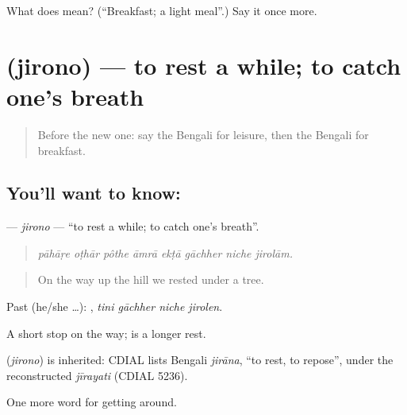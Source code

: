 \begin{tcolorbox}[breakable,colback=teal!4,colframe=teal!35!black,title={Before you move on}]
What does  mean? (\textquotedblleft{}Breakfast; a light meal\textquotedblright{}.) Say it once more.
\end{tcolorbox}
\section[\texorpdfstring{\bn{জিরোনো} (jirono)}{জিরোনো (jirono)}]{ (jirono) — to rest a while; to catch one's breath}

\label{lesson:BN-C404-jirono}



\begin{quote}
Before the new one: say the Bengali for leisure, then the Bengali for breakfast.
\end{quote}

\subsection*{You'll want to know: }
\textbf{} — \emph{jirono} — \textquotedblleft{}to rest a while; to catch one's breath\textquotedblright{}.

\begin{quote}
       
\end{quote}

\begin{quote}
\emph{pāhāṛe oṭhār pôthe āmrā ekṭā gāchher niche jirolām.}
\end{quote}

\begin{quote}
On the way up the hill we rested under a tree.
\end{quote}

Past (he/she …):    , \emph{tini gāchher niche jirolen}.

A short stop on the way;   is a longer rest.

\begin{cousinweb}
\textbf{} (\emph{jirono}) is inherited: CDIAL lists Bengali \emph{jirāna}, \textquotedblleft{}to rest, to repose\textquotedblright{}, under the reconstructed \emph{jīrayati} (CDIAL 5236).
\end{cousinweb}

\begin{grammarlens}[title={What you've built}]
One more word for getting around.
\end{grammarlens}

